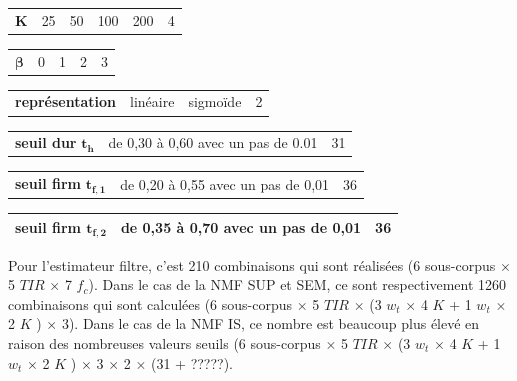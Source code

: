 \begin{table}[h]
\begin{tabularx}{17.5cm}{L{3cm}@{}C{3cm}@{}@{}C{3cm}@{}@{}C{3cm}@{}@{}C{3cm}@{}C{2cm}@{}}
    $\mathbf{K}$ & 25 & 50 & 100 & 200 & 4\\
\end{tabularx}

\begin{tabularx}{17.5cm}{L{3cm}@{}C{4cm}@{}@{}C{4cm}@{}@{}C{4cm}@{}C{2cm}@{}}
   $\mathbf{\beta}$ & 0 & 1 & 2 & 3\\
\end{tabularx}

\begin{tabularx}{17.5cm}{L{3cm}@{}C{6cm}@{}@{}C{6cm}@{}C{2cm}@{}}
   \textbf{représentation} & linéaire & sigmoïde & 2\\
\end{tabularx}

\begin{tabularx}{17.5cm}{L{3cm}@{}C{12cm}@{}C{2cm}@{}}
	\textbf{seuil dur} $\mathbf{t_h}$ & de 0,30 à 0,60 avec un pas de 0.01 & 31\\
\end{tabularx}

\begin{tabularx}{17.5cm}{L{3cm}@{}C{12cm}@{}C{2cm}@{}}
   \textbf{seuil firm} $\mathbf{t_{f,1}}$ & de 0,20 à 0,55 avec un pas de 0,01 & 36\\
\end{tabularx}

\begin{tabularx}{17.5cm}{L{3cm}@{}C{12cm}@{}C{2cm}@{}}
   \textbf{seuil firm} $\mathbf{t_{f,2}}$ & de 0,35 à 0,70 avec un pas de 0,01 & 36\\
   \bottomrule
\end{tabularx}
\label{tab:experimental_factorsNMF_ambiance}
\end{table}

Pour l'estimateur filtre, c'est 210 combinaisons qui sont réalisées (6 sous-corpus $\times$ 5 $TIR$ $\times$ 7 $f_c$). Dans le cas de la NMF SUP et SEM, ce sont respectivement 1260 combinaisons qui sont calculées (6 sous-corpus $\times$ 5 $TIR$ $\times$ (3 $w_t$ $\times$ 4 $K$ + 1 $w_t$ $\times$ 2 $K$ ) $\times$ 3). Dans le cas de la NMF IS, ce nombre est beaucoup plus élevé en raison des nombreuses valeurs seuils (6 sous-corpus $\times$ 5 $TIR$ $\times$ (3 $w_t$ $\times$ 4 $K$ + 1 $w_t$ $\times$ 2 $K$ ) $\times$ 3 $\times$ 2 $\times$ (31 + ?????).

